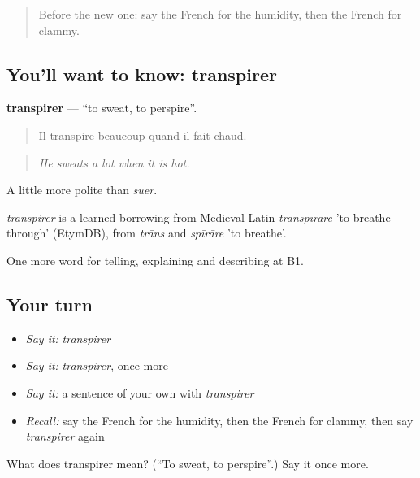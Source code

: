 \label{lesson:FR-C464-transpirer}



\begin{quote}
Before the new one: say the French for the humidity, then the French for clammy.
\end{quote}

\subsection*{You'll want to know: transpirer}
\textbf{transpirer} — \textquotedblleft{}to sweat, to perspire\textquotedblright{}.

\begin{quote}
Il transpire beaucoup quand il fait chaud.
\end{quote}

\begin{quote}
\emph{He sweats a lot when it is hot.}
\end{quote}

A little more polite than \emph{suer}.

\begin{cousinweb}
\emph{transpirer} is a learned borrowing from Medieval Latin \emph{transpīrāre} 'to breathe through' (EtymDB), from \emph{trāns} and \emph{spīrāre} 'to breathe'.
\end{cousinweb}

\begin{grammarlens}[title={What you've built}]
One more word for telling, explaining and describing at B1.
\end{grammarlens}

\subsection*{Your turn}
\begin{itemize}
\raggedright
  \item \emph{Say it:} \emph{transpirer}
  \item \emph{Say it:} \emph{transpirer}, once more
  \item \emph{Say it:} a sentence of your own with \emph{transpirer}
  \item \emph{Recall:} say the French for the humidity, then the French for clammy, then say \emph{transpirer} again
\end{itemize}

\begin{tcolorbox}[breakable,colback=teal!4,colframe=teal!35!black,title={Before you move on}]
What does transpirer mean? (\textquotedblleft{}To sweat, to perspire\textquotedblright{}.) Say it once more.
\end{tcolorbox}
